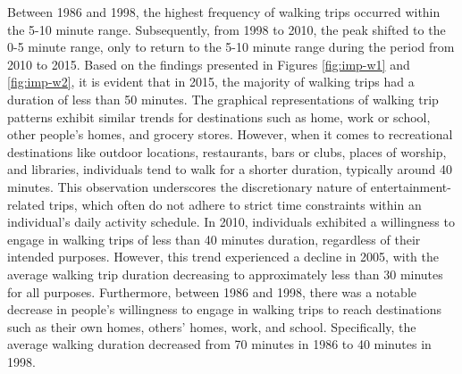 \documentclass[
11pt, %
oneside, %
english, %
singlespacing, %
]{macthesis} %
\begin{document}
Between 1986 and 1998, the highest frequency of walking trips occurred within the 5-10 minute range. Subsequently, from 1998 to 2010, the peak shifted to the 0-5 minute range, only to return to the 5-10 minute range during the period from 2010 to 2015. Based on the findings presented in Figures \ref{fig:imp-w1} and \ref{fig:imp-w2}, it is evident that in 2015, the majority of walking trips had a duration of less than 50 minutes. The graphical representations of walking trip patterns exhibit similar trends for destinations such as home, work or school, other people's homes, and grocery stores. However, when it comes to recreational destinations like outdoor locations, restaurants, bars or clubs, places of worship, and libraries, individuals tend to walk for a shorter duration, typically around
40 minutes. This observation underscores the discretionary nature of entertainment-related trips, which often do not adhere to strict time constraints within an individual's daily activity schedule. In 2010, individuals exhibited a willingness to engage in walking trips of less than 40 minutes duration, regardless of their intended purposes. However, this trend experienced a decline in 2005, with the average walking trip duration decreasing to approximately less than 30 minutes for all purposes. Furthermore, between 1986 and 1998, there was a notable decrease in people's willingness to engage
in walking trips to reach destinations such as their own homes, others' homes, work, and school. Specifically, the average walking duration decreased from 70 minutes in 1986 to 40 minutes in 1998.
\end{document}
